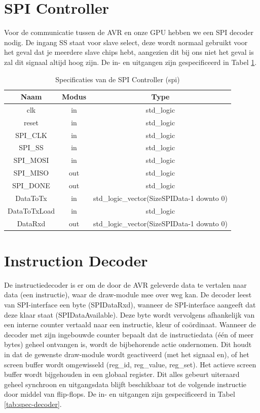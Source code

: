 \documentclass{scrreprt} %
\begin{document}
\section{SPI Controller}
Voor de communicatie tussen de AVR en onze GPU hebben we een SPI decoder nodig.
De ingang SS staat voor slave select, deze wordt normaal gebruikt voor het geval dat je meerdere slave chips hebt, aangezien dit bij ons niet het geval is zal dit signaal altijd hoog zijn.
De in- en uitgangen zijn gespecificeerd in Tabel \ref{tab:spec-spi}.

\begin{table}[H]
\centering
\caption{Specificaties van de SPI Controller (spi)}
\label{tab:spec-spi}
\begin{tabular}{c c c}
	\hline\hline
 	Naam & Modus & Type\\
 	\hline
	clk & in & std\_logic \\
	reset & in & std\_logic \\
	SPI\_CLK & in & std\_logic \\
	SPI\_SS & in & std\_logic \\
	SPI\_MOSI & in & std\_logic \\
	SPI\_MISO & out & std\_logic \\
	SPI\_DONE & out & std\_logic \\
	DataToTx & in & std\_logic\_vector(SizeSPIData-1 downto 0) \\
	DataToTxLoad & in & std\_logic \\
	DataRxd & out & std\_logic\_vector(SizeSPIData-1 downto 0) \\
  	\hline
\end{tabular}
\end{table}

\section{Instruction Decoder}
De instructiedecoder is er om de door de AVR geleverde data te vertalen naar data (een instructie), waar de draw-module mee over weg kan.
De decoder leest van SPI-interface een byte (SPIDataRxd), wanneer de SPI-interface aangeeft dat deze klaar staat (SPIDataAvailable).
Deze byte wordt vervolgens afhankelijk van een interne counter vertaald naar een instructie, kleur of coördinaat.
Wanneer de decoder met zijn ingebouwde counter bepaalt dat de instructiedata (één of meer bytes) geheel ontvangen is, wordt de bijbehorende actie ondernomen.
Dit houdt in dat de gewenste draw-module wordt geactiveerd (met het signaal en), of het screen buffer wordt omgewisseld (reg\_id, reg\_value, reg\_set).
Het actieve screen buffer wordt bijgehouden in een globaal register.
Dit alles gebeurt uiteraard geheel synchroon en uitgangsdata blijft beschikbaar tot de volgende instructie door middel van flip-flops.
De in- en uitgangen zijn gespecificeerd in Tabel \ref{tab:spec-decoder}.
\end{document}
